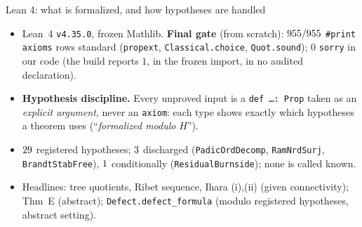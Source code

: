 \begin{frame}{Lean 4: what is formalized, and how hypotheses are handled}
  \small
  \begin{itemize}\setlength{\itemsep}{4pt}
    \item Lean~4 \texttt{v4.35.0}, frozen Mathlib. \textbf{Final gate} (from scratch):
      $955/955$ \texttt{\#print axioms} rows standard (\texttt{propext}, \texttt{Classical.choice}, \texttt{Quot.sound});
      $0$ \texttt{sorry} in our code (the build reports $1$, in the frozen import, in no audited declaration).
    \item \textbf{Hypothesis discipline.} Every unproved input is a \texttt{def \dots : Prop} taken as an \emph{explicit argument},
      never an \texttt{axiom}: each type shows exactly which hypotheses a theorem uses (``\emph{formalized modulo} $H$'').
    \item $29$ registered hypotheses; $3$ discharged (\texttt{PadicOrdDecomp}, \texttt{RamNrdSurj}, \texttt{BrandtStabFree}),
      $1$ conditionally (\texttt{ResidualBurnside}); none is called known.
    \item Headlines: tree quotients, Ribet sequence, Ihara (i),(ii) (given connectivity); Thm~E (abstract);
      \texttt{Defect.defect\_formula} (modulo registered hypotheses, abstract setting).
  \end{itemize}
\end{frame}
